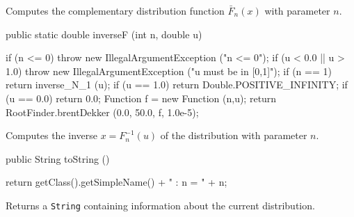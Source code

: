 \begin{tabb}
  Computes the complementary  distribution function  $\bar F_n(x)$ 
  with parameter $n$.
\end{tabb}
\begin{code}

   public static double inverseF (int n, double u)\begin{hide} {
      if (n <= 0)
         throw new IllegalArgumentException ("n <= 0");
      if (u < 0.0 || u > 1.0)
         throw new IllegalArgumentException ("u must be in [0,1]");
      if (n == 1)
         return inverse_N_1 (u);
      if (u == 1.0)
         return Double.POSITIVE_INFINITY;
      if (u == 0.0)
         return 0.0;
      Function f = new Function (n,u);
      return RootFinder.brentDekker (0.0, 50.0, f, 1.0e-5);
   }\end{hide}
\end{code}
\begin{tabb}
  Computes the inverse $x = F_n^{-1}(u)$ of the
  \ad{} distribution with parameter $n$.
\end{tabb}
\begin{hide}\begin{code}

   public String toString ()\begin{hide} {
      return getClass().getSimpleName() + " : n = " + n;
   }\end{hide}
\end{code}
\begin{tabb}
   Returns a \texttt{String} containing information about the current distribution.
\end{tabb}\end{hide}
\begin{code}\begin{hide}
}\end{hide}
\end{code}
